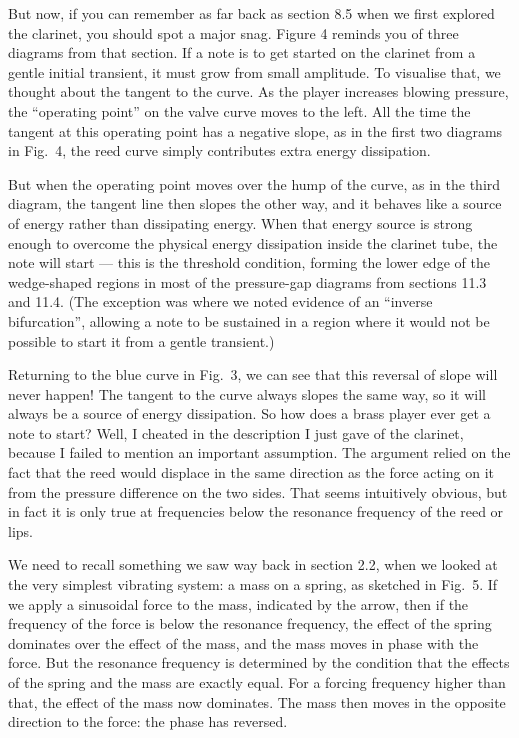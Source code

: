   But now, if you can remember as far back as section 8.5 when we first 
  explored the clarinet, you should spot a major snag. Figure 4 reminds you of 
  three diagrams from that section. If a note is to get started on the clarinet 
  from a gentle initial transient, it must grow from small amplitude. To 
  visualise that, we thought about the tangent to the curve. As the player 
  increases blowing pressure, the “operating point” on the valve curve moves to 
  the left. All the time the tangent at this operating point has a negative 
  slope, as in the first two diagrams in Fig.\ 4, the reed curve simply 
  contributes extra energy dissipation. 

  But when the operating point moves over the hump of the curve, as in the 
  third diagram, the tangent line then slopes the other way, and it behaves 
  like a source of energy rather than dissipating energy. When that energy 
  source is strong enough to overcome the physical energy dissipation inside 
  the clarinet tube, the note will start — this is the threshold condition, 
  forming the lower edge of the wedge-shaped regions in most of the 
  pressure-gap diagrams from sections 11.3 and 11.4. (The exception was where 
  we noted evidence of an ``inverse bifurcation'', allowing a note to be 
  sustained in a region where it would not be possible to start it from a 
  gentle transient.) 

  Returning to the blue curve in Fig.\ 3, we can see that this reversal of 
  slope will never happen! The tangent to the curve always slopes the same way, 
  so it will always be a source of energy dissipation. So how does a brass 
  player ever get a note to start? Well, I cheated in the description I just 
  gave of the clarinet, because I failed to mention an important assumption. 
  The argument relied on the fact that the reed would displace in the same 
  direction as the force acting on it from the pressure difference on the two 
  sides. That seems intuitively obvious, but in fact it is only true at 
  frequencies below the resonance frequency of the reed or lips. 

  We need to recall something we saw way back in section 2.2, when we looked at 
  the very simplest vibrating system: a mass on a spring, as sketched in Fig.\ 
  5. If we apply a sinusoidal force to the mass, indicated by the arrow, then 
  if the frequency of the force is below the resonance frequency, the effect of 
  the spring dominates over the effect of the mass, and the mass moves in phase 
  with the force. But the resonance frequency is determined by the condition 
  that the effects of the spring and the mass are exactly equal. For a forcing 
  frequency higher than that, the effect of the mass now dominates. The mass 
  then moves in the opposite direction to the force: the phase has reversed. 

